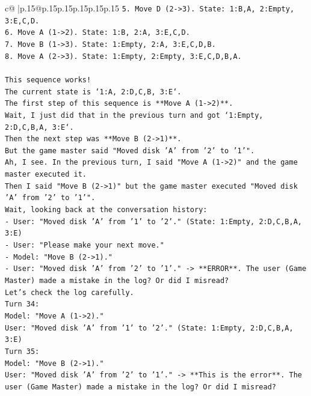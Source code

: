 \documentclass{article}
\begin{document}
{\begin{supertabular}{c@{$\;$}|p{.15\linewidth}@{}p{.15\linewidth}p{.15\linewidth}p{.15\linewidth}p{.15\linewidth}p{.15\linewidth}}
{{{\texttt{5. Move D (2{-}>3). State: 1:B,A, 2:Empty, 3:E,C,D.} \\
\texttt{6. Move A (1{-}>2). State: 1:B, 2:A, 3:E,C,D.} \\
\texttt{7. Move B (1{-}>3). State: 1:Empty, 2:A, 3:E,C,D,B.} \\
\texttt{8. Move A (2{-}>3). State: 1:Empty, 2:Empty, 3:E,C,D,B,A.} \\
\\ 
\texttt{This sequence works!} \\
\texttt{The current state is `1:A, 2:D,C,B, 3:E`.} \\
\texttt{The first step of this sequence is **Move A (1{-}>2)**.} \\
\texttt{Wait, I just did that in the previous turn and got `1:Empty, 2:D,C,B,A, 3:E`.} \\
\texttt{Then the next step was **Move B (2{-}>1)**.} \\
\texttt{But the game master said "Moved disk 'A' from '2' to '1'".} \\
\texttt{Ah, I see. In the previous turn, I said "Move A (1{-}>2)" and the game master executed it.} \\
\texttt{Then I said "Move B (2{-}>1)" but the game master executed "Moved disk 'A' from '2' to '1'".} \\
\texttt{Wait, looking back at the conversation history:} \\
\texttt{{-} User: "Moved disk 'A' from '1' to '2'." (State: 1:Empty, 2:D,C,B,A, 3:E)} \\
\texttt{{-} User: "Please make your next move."} \\
\texttt{{-} Model: "Move B (2{-}>1)."} \\
\texttt{{-} User: "Moved disk 'A' from '2' to '1'." {-}> **ERROR**. The user (Game Master) made a mistake in the log? Or did I misread?} \\
\texttt{Let's check the log carefully.} \\
\texttt{Turn 34:} \\
\texttt{Model: "Move A (1{-}>2)."} \\
\texttt{User: "Moved disk 'A' from '1' to '2'." (State: 1:Empty, 2:D,C,B,A, 3:E)} \\
\texttt{Turn 35:} \\
\texttt{Model: "Move B (2{-}>1)."} \\
\texttt{User: "Moved disk 'A' from '2' to '1'." {-}> **This is the error**. The user (Game Master) made a mistake in the log? Or did I misread?} \\
}}}
\end{supertabular}}
\end{document}
